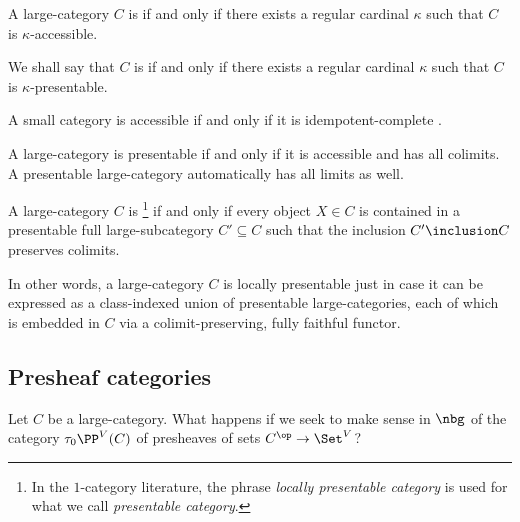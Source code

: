 \begin{definition}
	A large-category $ C $ is  if and only if
	there exists a regular cardinal $ \kappa $ such that
	$ C $ is $ \kappa $-accessible.

	We shall say that $ C $ is  if and only if
	there exists a regular cardinal $ \kappa $ such that
	$ C $ is $ \kappa $-presentable.
\end{definition}

\begin{eg}
	A small category is accessible if and only if it is idempotent-complete
	\citep[Corollary 5.4.3.6]{Lurie2009}.
\end{eg}

\begin{nul}
	A large-category is presentable if and only if
	it is accessible and has all colimits.
	A presentable large-category automatically has all limits as well.
\end{nul}

\begin{definition}%
	\label{dfn:locallypresentable}
	A large-category $ C $ is %
	\footnote{In the $1$-category literature,
		the phrase \emph{locally presentable category} is used for
		what we call \emph{presentable category}.}
	if and only if every object $ X \in C $
	is contained in a presentable full large-subcategory $ C' \subseteq C $
	such that the inclusion $ C' \inclusion C $ preserves colimits.
\end{definition}

\begin{nul}
	In other words, a large-category $ C $ is locally presentable
	just in case it can be expressed as
	a class-indexed union of presentable large-categories,
	each of which is embedded in $ C $ via
	a colimit-preserving, fully faithful functor.
\end{nul}

\subsection{Presheaf categories}%
\label{sub:presheaf_categories}

Let $ C $ be a large-category.
What happens if we seek to make sense in $ \nbg $
of the category $ \tau_0\PP^V(C) $ of presheaves of sets
$ C^{\op} \to \Set^V $?

